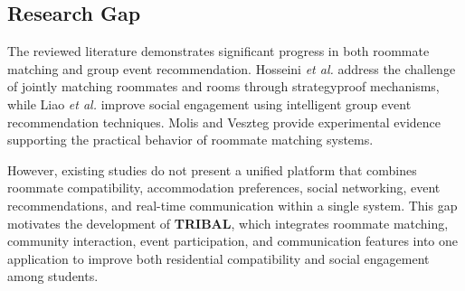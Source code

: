 \subsection{Research Gap}

The reviewed literature demonstrates significant progress in both roommate matching and group event recommendation. Hosseini \textit{et al.} address the challenge of jointly matching roommates and rooms through strategyproof mechanisms, while Liao \textit{et al.} improve social engagement using intelligent group event recommendation techniques. Molis and Veszteg provide experimental evidence supporting the practical behavior of roommate matching systems.

However, existing studies do not present a unified platform that combines roommate compatibility, accommodation preferences, social networking, event recommendations, and real-time communication within a single system. This gap motivates the development of \textbf{TRIBAL}, which integrates roommate matching, community interaction, event participation, and communication features into one application to improve both residential compatibility and social engagement among students.